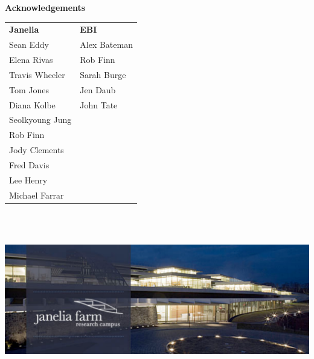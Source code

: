 \documentclass[landscape]{slides}
\begin{document}
\begin{slide}

\large
\begin{center}
\large{\textbf{Acknowledgements}} \\

\vspace{0.5in}

\normalsize
\begin{tabular}{ll}
\textbf{Janelia} & \textbf{EBI} \\
Sean Eddy           & Alex Bateman \\
Elena Rivas         & Rob Finn \\
Travis Wheeler      & Sarah Burge \\
Tom Jones           & Jen Daub \\
Diana Kolbe         & John Tate \\
Seolkyoung Jung     & \\
Rob Finn            & \\
Jody Clements       & \\
Fred Davis          & \\
Lee Henry           & \\
Michael Farrar      & \\
\end{tabular}

\includegraphics[height=3in]{figs/jfrc-banner1}

\end{center}

\vfill
\end{slide}
\end{document}
